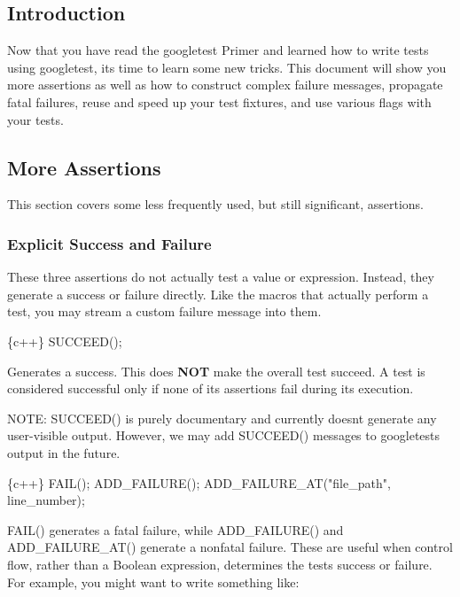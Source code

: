 \subsection*{Introduction}

Now that you have read the googletest Primer and learned how to write tests using googletest, it\textquotesingle{}s time to learn some new tricks. This document will show you more assertions as well as how to construct complex failure messages, propagate fatal failures, reuse and speed up your test fixtures, and use various flags with your tests.

\subsection*{More Assertions}

This section covers some less frequently used, but still significant, assertions.

\subsubsection*{Explicit Success and Failure}

These three assertions do not actually test a value or expression. Instead, they generate a success or failure directly. Like the macros that actually perform a test, you may stream a custom failure message into them.


\begin{DoxyCode}
\{c++\}
SUCCEED();
\end{DoxyCode}


Generates a success. This does {\bfseries N\+OT} make the overall test succeed. A test is considered successful only if none of its assertions fail during its execution.

N\+O\+TE\+: {\ttfamily S\+U\+C\+C\+E\+E\+D()} is purely documentary and currently doesn\textquotesingle{}t generate any user-\/visible output. However, we may add {\ttfamily S\+U\+C\+C\+E\+E\+D()} messages to googletest\textquotesingle{}s output in the future.


\begin{DoxyCode}
\{c++\}
FAIL();
ADD\_FAILURE();
ADD\_FAILURE\_AT("file\_path", line\_number);
\end{DoxyCode}


{\ttfamily F\+A\+I\+L()} generates a fatal failure, while {\ttfamily A\+D\+D\+\_\+\+F\+A\+I\+L\+U\+R\+E()} and {\ttfamily A\+D\+D\+\_\+\+F\+A\+I\+L\+U\+R\+E\+\_\+\+A\+T()} generate a nonfatal failure. These are useful when control flow, rather than a Boolean expression, determines the test\textquotesingle{}s success or failure. For example, you might want to write something like\+:


